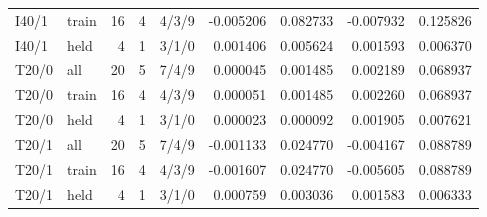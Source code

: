 {\begin{longtable}{@{}llrrcrrrr@{}}
I40/1 & train & 16 & 4 & 4/3/9 & -0.005206 & 0.082733 & -0.007932 & 0.125826 \\
I40/1 & held & 4 & 1 & 3/1/0 & 0.001406 & 0.005624 & 0.001593 & 0.006370 \\
T20/0 & all & 20 & 5 & 7/4/9 & 0.000045 & 0.001485 & 0.002189 & 0.068937 \\
T20/0 & train & 16 & 4 & 4/3/9 & 0.000051 & 0.001485 & 0.002260 & 0.068937 \\
T20/0 & held & 4 & 1 & 3/1/0 & 0.000023 & 0.000092 & 0.001905 & 0.007621 \\
T20/1 & all & 20 & 5 & 7/4/9 & -0.001133 & 0.024770 & -0.004167 & 0.088789 \\
T20/1 & train & 16 & 4 & 4/3/9 & -0.001607 & 0.024770 & -0.005605 & 0.088789 \\
T20/1 & held & 4 & 1 & 3/1/0 & 0.000759 & 0.003036 & 0.001583 & 0.006333 \\
\end{longtable}
}

